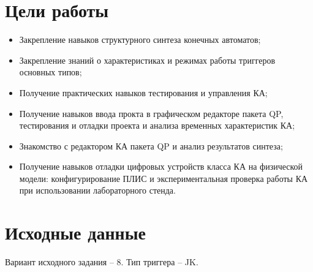 \documentclass[a4paper,12pt]{article}
\begin{document}
    

    \tableofcontents

    \section{Цели работы}
    \begin{itemize}
        \item Закрепление навыков структурного синтеза конечных автоматов;
        \item Закрепление знаний о характеристиках и режимах работы триггеров основных типов;
        \item Получение практических навыков тестирования и управления КА;
        \item Получение навыков ввода прокта в графическом редакторе пакета QP,
        тестирования и отладки проекта и анализа временных характеристик КА;
        \item Знакомство с редактором КА пакета QP  и анализ результатов синтеза;
        \item Получение навыков отладки цифровых устройств класса КА на физической модели:
        конфигурирование ПЛИС и экспериментальная проверка работы КА при использовании
        лабораторного стенда.
    \end{itemize}
    \section{Исходные данные}
    Вариант исходного задания -- 8. Тип триггера -- JK.
\end{document}
